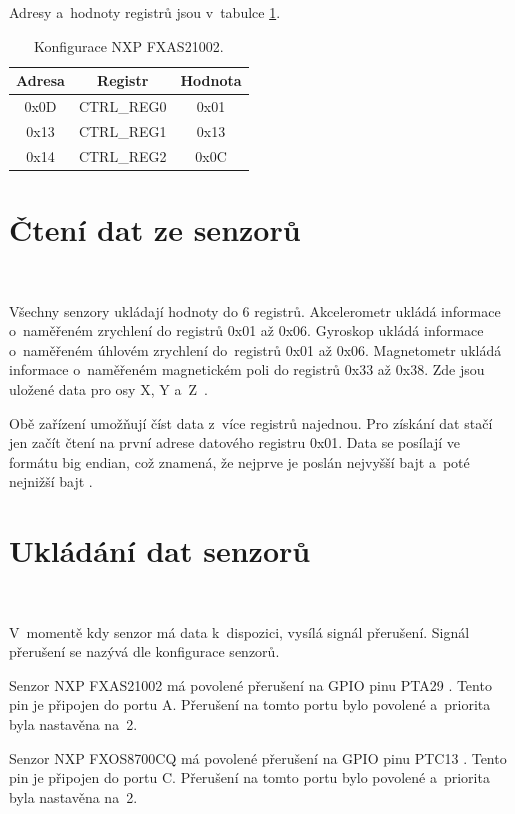 Adresy a~hodnoty registrů jsou v~tabulce \ref{tab:FXAS21002}.

\begin{table}[!h]
    \centering
    \begin{tabular}{ccc}
        \hline
        \textbf{Adresa} & \textbf{Registr} & \textbf{Hodnota} \\
        \hline
        0x0D            & CTRL\_REG0       & 0x01             \\
        0x13            & CTRL\_REG1       & 0x13             \\
        0x14            & CTRL\_REG2       & 0x0C             \\
        \hline
    \end{tabular}
    \caption{Konfigurace NXP FXAS21002.}
    \label{tab:FXAS21002}
\end{table}

\section{Čtení dat ze senzorů}\

Všechny senzory ukládají hodnoty do 6 registrů. Akcelerometr ukládá informace
o~naměřeném zrychlení do registrů 0x01 až 0x06. Gyroskop ukládá informace 
o~naměřeném úhlovém zrychlení do~registrů 0x01 až 0x06. Magnetometr ukládá 
informace o~naměřeném magnetickém poli do registrů 0x33 až 0x38. Zde jsou 
uložené data pro osy X, Y a~Z~\cite{FXAS21002}\cite{FXOS8700CQ}.

Obě zařízení umožňují číst data z~více registrů najednou. Pro získání dat stačí jen
začít čtení na první adrese datového registru 0x01. Data se posílají ve formátu big
endian, což znamená, že nejprve je poslán nejvyšší bajt a~poté nejnižší bajt \cite{FXAS21002}\cite{FXOS8700CQ}.

\section{Ukládání dat senzorů}\

V~momentě kdy senzor má data k~dispozici, vysílá signál přerušení. 
Signál přerušení se nazývá  dle konfigurace senzorů. 

Senzor NXP FXAS21002 má povolené přerušení na GPIO pinu PTA29 
\cite{frdmk66UserGuide}. Tento pin je připojen do portu A. Přerušení na tomto portu bylo povolené a~priorita byla nastavěna na~2.

Senzor NXP FXOS8700CQ má povolené přerušení na GPIO pinu PTC13 
\cite{frdmk66UserGuide}. Tento pin je připojen do portu C. Přerušení na tomto portu bylo povolené a~priorita byla nastavěna na~2.

